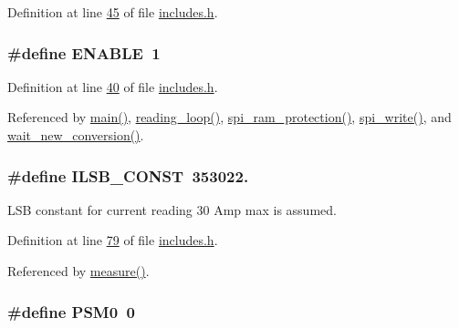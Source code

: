 Definition at line \hyperlink{a00037_source_l00045}{45} of file \hyperlink{a00037_source}{includes.\-h}.

\hypertarget{a00037_a514ad415fb6125ba296793df7d1a468a}{
\subsubsection[{E\-N\-A\-B\-L\-E}]{\setlength{\rightskip}{0pt plus 5cm}\#define E\-N\-A\-B\-L\-E~1}}\label{d1/dc6/a00037_a514ad415fb6125ba296793df7d1a468a}


Definition at line \hyperlink{a00037_source_l00040}{40} of file \hyperlink{a00037_source}{includes.\-h}.



Referenced by \hyperlink{a00035_source_l00198}{main()}, \hyperlink{a00035_source_l00302}{reading\-\_\-loop()}, \hyperlink{a00040_source_l00343}{spi\-\_\-ram\-\_\-protection()}, \hyperlink{a00040_source_l00221}{spi\-\_\-write()}, and \hyperlink{a00035_source_l00122}{wait\-\_\-new\-\_\-conversion()}.

\hypertarget{a00037_a88b595bff6a462c91ddc1cafbd6e4140}{
\subsubsection[{I\-L\-S\-B\-\_\-\-C\-O\-N\-S\-T}]{\setlength{\rightskip}{0pt plus 5cm}\#define I\-L\-S\-B\-\_\-\-C\-O\-N\-S\-T~353022.}}\label{d1/dc6/a00037_a88b595bff6a462c91ddc1cafbd6e4140}


L\-S\-B constant for current reading 30 Amp max is assumed. 



Definition at line \hyperlink{a00037_source_l00079}{79} of file \hyperlink{a00037_source}{includes.\-h}.



Referenced by \hyperlink{a00042_source_l00040}{measure()}.

\hypertarget{a00037_ad03c0079a6239f78368cb14cc4578101}{
\subsubsection[{P\-S\-M0}]{\setlength{\rightskip}{0pt plus 5cm}\#define P\-S\-M0~0}}\label{d1/dc6/a00037_ad03c0079a6239f78368cb14cc4578101}


